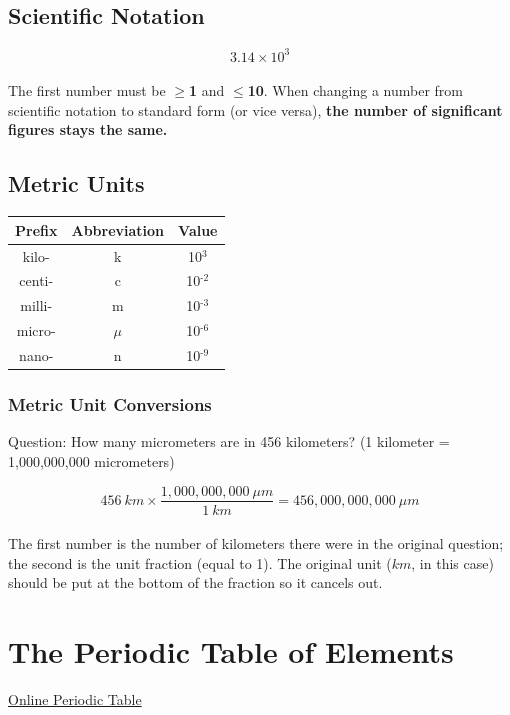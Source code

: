 \documentclass[a4paper, 12pt]{article}
\begin{document}
\subsection*{Scientific Notation}
$$3.14 \times 10^3$$
\\
The first number must be \textbf{$\geq$1} and \textbf{$\leq$10}. When changing a number from scientific notation to standard form (or vice versa), \textbf{the number of significant figures stays the same.}

\subsection*{Metric Units}
\begin{center}
\begin{tabular}{c|c|c}
   \textbf{Prefix} & \textbf{Abbreviation} & \textbf{Value} \\\hline
    kilo- & k & 10$^3$ \\
    centi- & c & 10$^{\text{-2}}$ \\
    milli- & m & 10$^{\text{-3}}$ \\
    micro- & $\mu$ & 10$^{\text{-6}}$ \\
    nano- & n & 10$^{\text{-9}}$ \\
\end{tabular}
\end{center}

\subsubsection*{Metric Unit Conversions}
Question: How many micrometers are in 456 kilometers? (1 kilometer = 1,000,000,000 micrometers)

$$456 \: km \times \frac{1,000,000,000 \: \mu m}{1 \: km} = 456,000,000,000 \: \mu m$$
\\
\noindent The first number is the number of kilometers there were in the original question; the second is the unit fraction (equal to 1). The original unit ($km$, in this case) should be put at the bottom of the fraction so it cancels out.

\section{The Periodic Table of Elements}

\textcolor{teal}{{\href{https://ptable.com}{Online Periodic Table}}}
\end{document}

